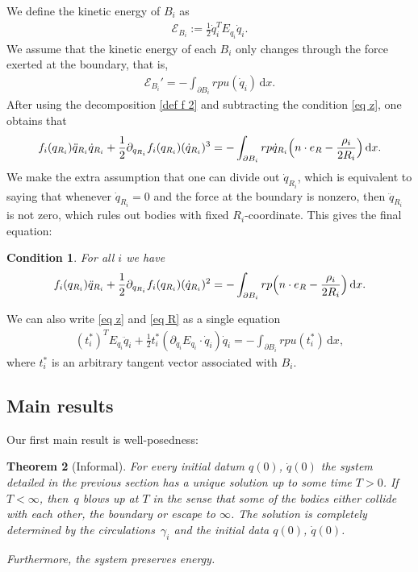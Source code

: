 \documentclass[10pt]{amsart}
\newtheorem{theorem}{Theorem}[subsection]
\newtheorem{condition}[theorem]{Condition}
\theoremstyle{definition}
\newcommand\eq{=}
\newcommand\dd{\,\mathrm{d}}
\newcommand\dx{\dd x}
\let\de\partial
\begin{document}
We define the kinetic energy of $B_i$ as
\begin{align}\label{intEnergy}
\mathcal{E}_{B_i}:=\frac{1}{2}\dot{q}_i^TE_{q_i}\dot{q}_i.
\end{align}
We assume that the kinetic energy of each $B_i$ only changes through the force exerted at the boundary, that is,
\begin{align}
\mathcal{E}_{B_i}'\eq-\int_{\de B_i} rpu(\dot{q}_i)\dx.\label{energyBalance}
\end{align}
After using the decomposition \eqref{def f 2} and subtracting the condition \eqref{eq z}, one obtains that
\begin{align*}%
f_i(q_{R_i})\ddot{q}_{R_i}\dot{q}_{R_i}+\frac{1}{2}\de_{q_{R_i}}f_i(q_{R_i})(\dot{q}_{R_i})^3\eq -\int_{\de B_i}r p\dot{q}_{R_i}\Bigl(n\cdot e_R -\frac{\rho_i}{2R_i}\Bigr)\dx.
\end{align*}
We make the extra assumption that one can divide out $\dot{q}_{R_i}$, which is equivalent to saying that whenever $\dot{q}_{R_i}=0$ and the force at the boundary is nonzero, then $\ddot{q}_{R_i}$ is not zero, which rules out bodies with fixed $R_i$-coordinate. This gives the final equation:
\begin{condition}
For all $i$ we have
\begin{align}\label{eq R}
f_i(q_{R_i})\ddot{q}_{R_i}+\frac{1}{2}\de_{q_{R_i}}f_i(q_{R_i})(\dot{q}_{R_i})^2\eq -\int_{\de B_i}r p \Bigl(n\cdot e_R -\frac{\rho_i}{2R_i} \Bigr)\dx.
\end{align}
\end{condition}

We can also write \eqref{eq z} and \eqref{eq R} as a single equation
\begin{align}\label{2ndDeri}
(t_i^*)^TE_{q_i}\ddot{q}_i+\frac{1}{2}t_i^*(\de_{\dot{q}_i} E_{q_i}\cdot \dot{q}_i)\dot{q}_i\eq-\int_{\de B_i} rpu(t_i^*)\dx,
\end{align}
where $t_i^*$ is an arbitrary tangent vector associated with $B_i$.

\subsection{Main results}\label{Main results}

Our first main result is well-posedness: \begin{theorem}[Informal]
For every initial datum $q(0)$, $\dot{q}(0)$ the system detailed in the previous section has a unique solution up to some time $T>0$.
If $T<\infty$, then~$q$ blows up at $T$ in the sense that some of the bodies either collide with each other, the boundary or escape to $\infty$. The solution is completely determined by the circulations~$\gamma_i$ and the initial data $q(0)$, $\dot{q}(0)$.

Furthermore, the system preserves energy.
\end{theorem}
\end{document}

